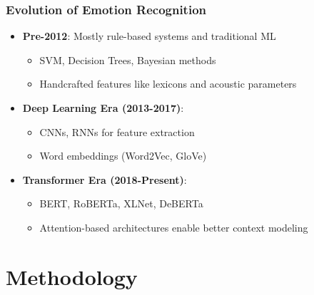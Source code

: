\documentclass{beamer}
\begin{document}
\begin{frame}
\frametitle{Evolution of Emotion Recognition}
\begin{itemize}
    \item \textbf{Pre-2012}: Mostly rule-based systems and traditional ML
    \begin{itemize}
        \item SVM, Decision Trees, Bayesian methods
        \item Handcrafted features like lexicons and acoustic parameters
    \end{itemize}
    \item \textbf{Deep Learning Era (2013-2017)}: 
    \begin{itemize}
        \item CNNs, RNNs for feature extraction
        \item Word embeddings (Word2Vec, GloVe)
    \end{itemize}
    \item \textbf{Transformer Era (2018-Present)}:
    \begin{itemize}
        \item BERT, RoBERTa, XLNet, DeBERTa
        \item Attention-based architectures enable better context modeling
    \end{itemize}
\end{itemize}
\end{frame}

\section{Methodology}
\end{document}
